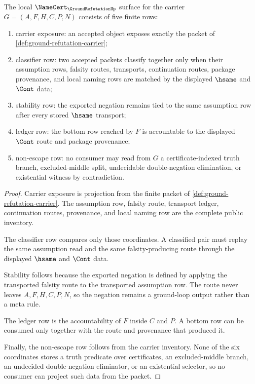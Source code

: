 \begin{theorem}
\label{thm:ground-refutation-namecert-obligations}
The local $\NameCert_{\GroundRefutationUp}$ surface for the carrier $G=(A,F,H,C,P,N)$ consists of five finite rows:
\begin{enumerate}
\item carrier exposure: an accepted object exposes exactly the packet of \autoref{def:ground-refutation-carrier};
\item classifier row: two accepted packets classify together only when their assumption rows, falsity routes, transports, continuation routes, package provenance, and local naming rows are matched by the displayed $\hsame$ and $\Cont$ data;
\item stability row: the exported negation remains tied to the same assumption row after every stored $\hsame$ transport;
\item ledger row: the bottom row reached by $F$ is accountable to the displayed $\Cont$ route and package provenance;
\item non-escape row: no consumer may read from $G$ a certificate-indexed truth branch, excluded-middle split, undecidable double-negation elimination, or existential witness by contradiction.
\end{enumerate}
\end{theorem}
\begin{proof}
Carrier exposure is projection from the finite packet of \autoref{def:ground-refutation-carrier}. The assumption row, falsity route, transport ledger, continuation routes, provenance, and local naming row are the complete public inventory.

The classifier row compares only those coordinates. A classified pair must replay the same assumption read and the same falsity-producing route through the displayed $\hsame$ and $\Cont$ data.

Stability follows because the exported negation is defined by applying the transported falsity route to the transported assumption row. The route never leaves $A,F,H,C,P,N$, so the negation remains a ground-loop output rather than a meta rule.

The ledger row is the accountability of $F$ inside $C$ and $P$. A bottom row can be consumed only together with the route and provenance that produced it.

Finally, the non-escape row follows from the carrier inventory. None of the six coordinates stores a truth predicate over certificates, an excluded-middle branch, an undecided double-negation eliminator, or an existential selector, so no consumer can project such data from the packet.
\end{proof}


